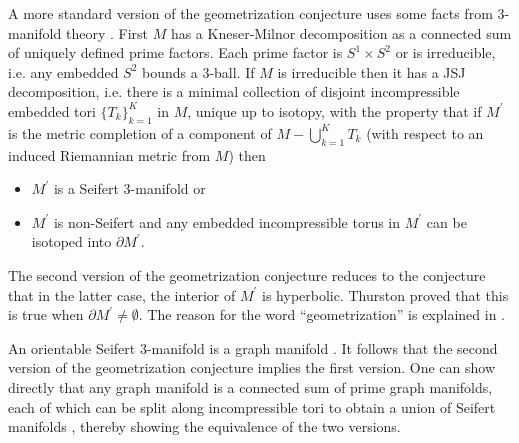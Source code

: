 A more standard version of the geometrization conjecture uses
some facts from $3$-manifold theory
\cite{Scott}. First $M$ has a Kneser-Milnor decomposition as
a connected sum of uniquely defined prime factors. Each prime factor is
$S^1 \times S^2$ or is irreducible, i.e. any embedded $S^2$ bounds
a $3$-ball. If $M$ is irreducible then it has a JSJ decomposition, i.e.
there is a minimal collection
of disjoint incompressible
embedded tori $\{T_k\}_{k=1}^K$ in $M$, unique up
to isotopy, with the property that
if $M^\prime$ is the metric completion of a component of
$M - \bigcup_{k=1}^K T_k$ (with respect to an induced
Riemannian metric from $M$) then
\begin{itemize}
\item $M^\prime$ is a Seifert $3$-manifold or
\item $M^\prime$ is non-Seifert and any embedded incompressible torus in
$M^\prime$ can be isotoped into $\partial M^\prime$.
\end{itemize}
The second version of the geometrization conjecture reduces to
the conjecture that in the latter case, the interior
of $M^\prime$ is hyperbolic. Thurston proved that this is true when
$\partial M^\prime \neq \emptyset$.
The reason for the word ``geometrization''
is explained in \cite{Scott,Thurston}.

An orientable Seifert $3$-manifold is a graph manifold
\cite[Proposition 2.4.2]{Matveev}. It follows that
the second version of the geometrization conjecture implies the
first version. One can show directly that any graph manifold
is a connected sum of prime graph manifolds, each of which can be split
along incompressible tori to
obtain a union of Seifert manifolds \cite[Proposition 2.4.7]{Matveev},
thereby showing the equivalence of the two versions.
